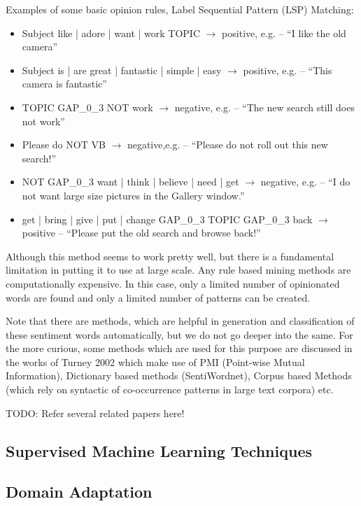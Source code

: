 Examples of some basic opinion rules, Label Sequential Pattern (LSP) Matching:
\begin{itemize}
\item Subject {like | adore | want | work} TOPIC $\rightarrow$ positive, e.g. – ``I like the old camera”
\item Subject {is | are} {great | fantastic | simple | easy} $\rightarrow$ positive, e.g. – ``This camera is fantastic”
\item TOPIC GAP\_0\_3 NOT work $\rightarrow$ negative, e.g. – ``The new search still does not work”
\item Please do NOT VB $\rightarrow$ negative,e.g. – ``Please do not roll out this new search!”
\item NOT GAP\_0\_3 {want | think | believe | need | get} $\rightarrow$ negative, e.g. – ``I do not want large size pictures in the Gallery window.”
\item {get | bring | give | put | change} GAP\_0\_3 TOPIC GAP\_0\_3 back $\rightarrow$ positive
– ``Please put the old search and browse back!”
\end{itemize} 

Although this method seems to work pretty well, but there is a fundamental limitation in putting it to use at large scale. Any rule based mining methods are computationally expensive. In this case, only a limited number of opinionated words are found and only a limited number of patterns can be created. 

Note that there are methods, which are helpful in generation and classification of these sentiment words automatically, but we do not go deeper into the same. For the more curious, some methods which are used for this purpose are discussed in the works of Turney 2002 which make use of PMI (Point-wise Mutual Information), Dictionary based methods (SentiWordnet), Corpus based Methods (which rely on syntactic of co-occurrence patterns in large text corpora) etc. 

TODO: Refer several related papers here! 

\subsection{Supervised Machine Learning Techniques}
\subsection{Domain Adaptation}
